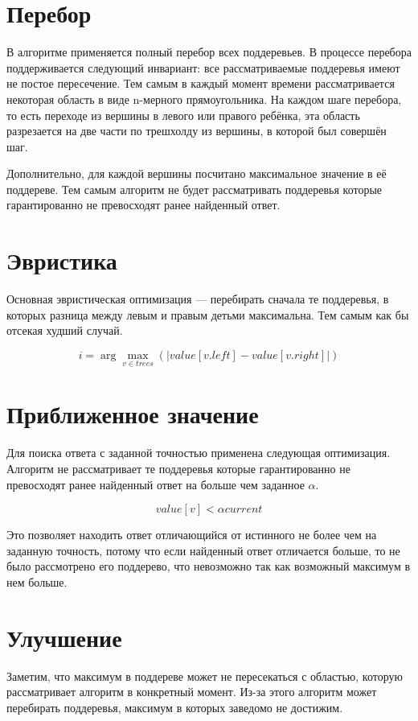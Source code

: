 \documentclass[pscyr,specification,annotation]{itmo-student-thesis}
\begin{document}
\section{Перебор}
В алгоритме применяется полный перебор всех поддеревьев. В процессе перебора
поддерживается следующий инвариант: все рассматриваемые поддеревья имеют не
постое пересечение. Тем самым в каждый момент времени рассматривается некоторая
область в виде n-мерного прямоугольника. На каждом шаге перебора, то есть
переходе из вершины в левого или правого ребёнка, эта область разрезается на две
части по трешхолду из вершины, в которой был совершён шаг.

Дополнительно, для каждой вершины посчитано максимальное значение в её
поддереве. Тем самым алгоритм не будет рассматривать поддеревья которые
гарантированно не превосходят ранее найденный ответ.

\section{Эвристика}
Основная эвристическая оптимизация --- перебирать сначала те поддеревья,
в которых разница между левым и правым детьми максимальна. Тем самым как бы
отсекая худший случай.

\[
    i = \arg \max_{v \in trees}(|value[v.left] - value[v.right]|)
\]

\section{Приближенное значение}
Для поиска ответа с заданной точностью применена следующая оптимизация. Алгоритм
не рассматривает те поддеревья которые гарантированно не превосходят ранее
найденный ответ на больше чем заданное $\alpha$.

\[
    value[v] < \alpha current
\]

Это позволяет находить ответ отличающийся от истинного не более чем на заданную
точность, потому что если найденный ответ отличается больше, то не было
рассмотрено его поддерево, что невозможно так как возможный максимум в нем
больше.

\section{Улучшение}

Заметим, что максимум в поддереве может не пересекаться с областью, которую
рассматривает алгоритм в конкретный момент. Из-за этого алгоритм может
перебирать поддеревья, максимум в которых заведомо не достижим.
\end{document}
